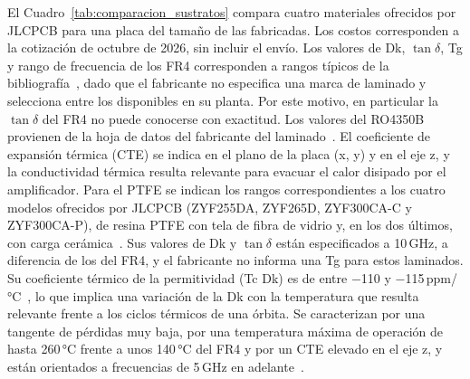 El Cuadro~\ref{tab:comparacion_sustratos} compara cuatro materiales ofrecidos por JLCPCB para una placa del tamaño de las fabricadas. Los costos corresponden a la cotización de octubre de 2026, sin incluir el envío. Los valores de Dk, $\tan\delta$, Tg y rango de frecuencia de los FR4 corresponden a rangos típicos de la bibliografía~\cite{JLCFR4,JLCTg}, dado que el fabricante no especifica una marca de laminado y selecciona entre los disponibles en su planta. Por este motivo, en particular la $\tan\delta$ del FR4 no puede conocerse con exactitud. Los valores del RO4350B provienen de la hoja de datos del fabricante del laminado~\cite{RogersDS}. El coeficiente de expansión térmica (CTE) se indica en el plano de la placa (x, y) y en el eje z, y la conductividad térmica resulta relevante para evacuar el calor disipado por el amplificador. Para el PTFE se indican los rangos correspondientes a los cuatro modelos ofrecidos por JLCPCB (ZYF255DA, ZYF265D, ZYF300CA-C y ZYF300CA-P), de resina PTFE con tela de fibra de vidrio y, en los dos últimos, con carga cerámica~\cite{JLCPTFE}. Sus valores de Dk y $\tan\delta$ están especificados a 10\,GHz, a diferencia de los del FR4, y el fabricante no informa una Tg para estos laminados. Su coeficiente térmico de la permitividad (Tc Dk) es de entre $-$110 y $-$115\,ppm/°C~\cite{JLCPTFE}, lo que implica una variación de la Dk con la temperatura que resulta relevante frente a los ciclos térmicos de una órbita. Se caracterizan por una tangente de pérdidas muy baja, por una temperatura máxima de operación de hasta 260\,°C frente a unos 140\,°C del FR4 y por un CTE elevado en el eje z, y están orientados a frecuencias de 5\,GHz en adelante~\cite{JLCPTFE}.

\begin{table}[H]
    \centering
    \caption{Comparación de materiales de sustrato disponibles en JLCPCB.}
    \label{tab:comparacion_sustratos}
\end{table}

